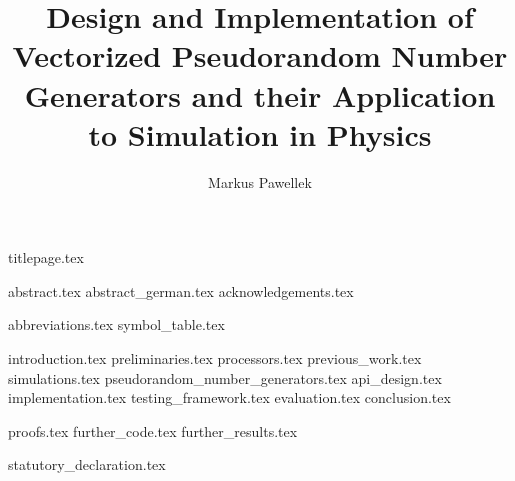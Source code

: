 \documentclass[fleqn,10pt,twoside]{stdglobal}
\title{Design and Implementation of Vectorized Pseudorandom Number Generators and their Application to Simulation in Physics}
\author{Markus Pawellek}
\let\oldpagenumbering\pagenumbering
\renewcommand*\pagenumbering[1]{\cleardoublepage\oldpagenumbering{#1}}
\begin{document}

  {titlepage.tex}

  {abstract.tex}
  \cleardoublepage
  {abstract_german.tex}
  {acknowledgements.tex}

  \tableofcontents
  \listoffigures
  \listoftables
  \listofmath
  \listofcode
  {abbreviations.tex}
  {symbol_table.tex}

  {introduction.tex}
  {preliminaries.tex}
  {processors.tex}
  {previous_work.tex}
  {simulations.tex}
  {pseudorandom_number_generators.tex}
  {api_design.tex}
  {implementation.tex}
  {testing_framework.tex}
  {evaluation.tex}
  {conclusion.tex}
  \printbibliography[heading=bibintoc]

  \appendix
  {proofs.tex}
  {further_code.tex}
  {further_results.tex}

  {statutory_declaration.tex}
\end{document}
